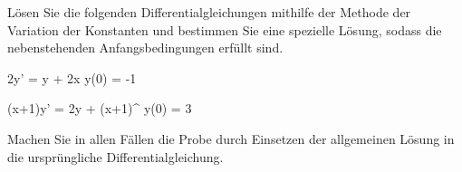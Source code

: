 \begin{atiTask}[
	title = Die Methode der Variation der Konstanten II,
	topic = Gewöhnliche Differentialgleichungen,
	subtopic = Lineare Differentialgleichungen 1. Ordnung,
	language = Deutsch
]
	Lösen Sie die folgenden Differentialgleichungen mithilfe der Methode der Variation der Konstanten und bestimmen Sie eine spezielle Lösung, sodass die nebenstehenden Anfangsbedingungen erfüllt sind.
	\begin{atiSubequations}
		\item{
			2y' = y + 2\sin x \separate y(0) = -1
		}
		\item{
			(x+1)y' = 2y + (x+1)^ \separate y(0) = 3
		}
	\end{atiSubequations}
	Machen Sie in allen Fällen die Probe durch Einsetzen der allgemeinen Lösung in die ursprüngliche Differentialgleichung.
\end{atiTask}